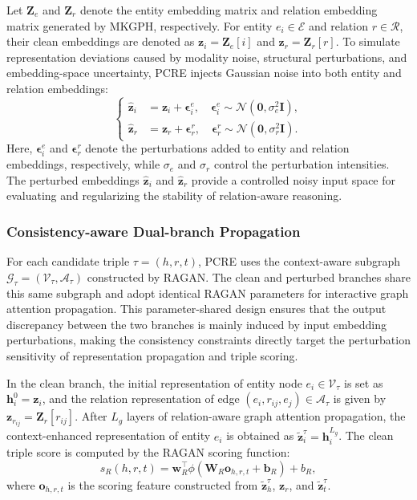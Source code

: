 \documentclass[a4paper,fleqn]{cas-sc}
\begin{document}
Let $\mathbf{Z}_{e}$ and $\mathbf{Z}_{r}$ denote the entity embedding matrix and relation embedding matrix generated by MKGPH, respectively. For entity $e_i\in\mathcal{E}$ and relation $r\in\mathcal{R}$, their clean embeddings are denoted as $\mathbf{z}_i=\mathbf{Z}_{e}[i]$ and $\mathbf{z}_r=\mathbf{Z}_{r}[r]$. To simulate representation deviations caused by modality noise, structural perturbations, and embedding-space uncertainty, PCRE injects Gaussian noise into both entity and relation embeddings:
\begin{equation}
\left\{
\begin{aligned}
\widehat{\mathbf{z}}_i
&=
\mathbf{z}_i
+
\boldsymbol{\epsilon}_i^{e},
\quad
\boldsymbol{\epsilon}_i^{e}
\sim
\mathcal{N}(\mathbf{0},\sigma_{e}^{2}\mathbf{I}), \\
\widehat{\mathbf{z}}_r
&=
\mathbf{z}_r
+
\boldsymbol{\epsilon}_r^{r},
\quad
\boldsymbol{\epsilon}_r^{r}
\sim
\mathcal{N}(\mathbf{0},\sigma_{r}^{2}\mathbf{I}).
\end{aligned}
\right.
\end{equation}
Here, $\boldsymbol{\epsilon}_i^{e}$ and $\boldsymbol{\epsilon}_r^{r}$ denote the perturbations added to entity and relation embeddings, respectively, while $\sigma_e$ and $\sigma_r$ control the perturbation intensities. The perturbed embeddings $\widehat{\mathbf{z}}_i$ and $\widehat{\mathbf{z}}_r$ provide a controlled noisy input space for evaluating and regularizing the stability of relation-aware reasoning.

\subsubsection{Consistency-aware Dual-branch Propagation}

For each candidate triple $\tau=(h,r,t)$, PCRE uses the context-aware subgraph $\mathcal{G}_{\tau}=(\mathcal{V}_{\tau},\mathcal{A}_{\tau})$ constructed by RAGAN. The clean and perturbed branches share this same subgraph and adopt identical RAGAN parameters for interactive graph attention propagation. This parameter-shared design ensures that the output discrepancy between the two branches is mainly induced by input embedding perturbations, making the consistency constraints directly target the perturbation sensitivity of representation propagation and triple scoring.

In the clean branch, the initial representation of entity node $e_i\in\mathcal{V}_{\tau}$ is set as $\mathbf{h}_{i}^{0}=\mathbf{z}_{i}$, and the relation representation of edge $(e_i,r_{ij},e_j)\in\mathcal{A}_{\tau}$ is given by $\mathbf{z}_{r_{ij}}=\mathbf{Z}_{r}[r_{ij}]$. After $L_g$ layers of relation-aware graph attention propagation, the context-enhanced representation of entity $e_i$ is obtained as $\widetilde{\mathbf{z}}_{i}^{\tau}=\mathbf{h}_{i}^{L_g}$. The clean triple score is computed by the RAGAN scoring function:
\begin{equation}
s_R(h,r,t)
=
\mathbf{w}_{R}^{\top}
\phi
\left(
\mathbf{W}_{R}
\mathbf{o}_{h,r,t}
+
\mathbf{b}_{R}
\right)
+
b_{R},
\end{equation}
where $\mathbf{o}_{h,r,t}$ is the scoring feature constructed from $\widetilde{\mathbf{z}}_{h}^{\tau}$, $\mathbf{z}_{r}$, and $\widetilde{\mathbf{z}}_{t}^{\tau}$.
\end{document}
